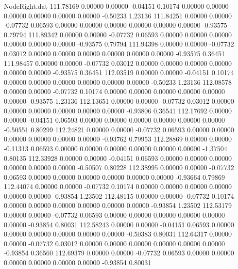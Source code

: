 \begin{filecontents}{NodeRight.dat}
 111.78169    0.00000    0.00000    -0.04151    0.10174    0.00000    0.00000    0.00000    0.00000    0.00000    0.00000   -0.50233    1.23136
 111.84251    0.00000    0.00000    -0.07732    0.06593    0.00000    0.00000    0.00000    0.00000    0.00000    0.00000   -0.93575    0.79794
 111.89342    0.00000    0.00000    -0.07732    0.06593    0.00000    0.00000    0.00000    0.00000    0.00000    0.00000   -0.93575    0.79794
 111.94398    0.00000    0.00000    -0.07732    0.03012    0.00000    0.00000    0.00000    0.00000    0.00000    0.00000   -0.93575    0.36451
 111.98457    0.00000    0.00000    -0.07732    0.03012    0.00000    0.00000    0.00000    0.00000    0.00000    0.00000   -0.93575    0.36451
 112.03519    0.00000    0.00000    -0.04151    0.10174    0.00000    0.00000    0.00000    0.00000    0.00000    0.00000   -0.50233    1.23136
 112.08578    0.00000    0.00000    -0.07732    0.10174    0.00000    0.00000    0.00000    0.00000    0.00000    0.00000   -0.93575    1.23136
 112.13651    0.00000    0.00000    -0.07732    0.03012    0.00000    0.00000    0.00000    0.00000    0.00000    0.00000   -0.93806    0.36541
 112.17692    0.00000    0.00000    -0.04151    0.06593    0.00000    0.00000    0.00000    0.00000    0.00000    0.00000   -0.50551    0.80299
 112.24821    0.00000    0.00000    -0.07732    0.06593    0.00000    0.00000    0.00000    0.00000    0.00000    0.00000   -0.93762    0.79953
 112.28869    0.00000    0.00000    -0.11313    0.06593    0.00000    0.00000    0.00000    0.00000    0.00000    0.00000   -1.37504    0.80135
 112.33928    0.00000    0.00000    -0.04151    0.06593    0.00000    0.00000    0.00000    0.00000    0.00000    0.00000   -0.50507    0.80228
 112.38995    0.00000    0.00000    -0.07732    0.06593    0.00000    0.00000    0.00000    0.00000    0.00000    0.00000   -0.93664    0.79869
 112.44074    0.00000    0.00000    -0.07732    0.10174    0.00000    0.00000    0.00000    0.00000    0.00000    0.00000   -0.93854    1.23502
 112.48115    0.00000    0.00000    -0.07732    0.10174    0.00000    0.00000    0.00000    0.00000    0.00000    0.00000   -0.93854    1.23502
 112.53179    0.00000    0.00000    -0.07732    0.06593    0.00000    0.00000    0.00000    0.00000    0.00000    0.00000   -0.93854    0.80031
 112.58243    0.00000    0.00000    -0.04151    0.06593    0.00000    0.00000    0.00000    0.00000    0.00000    0.00000   -0.50383    0.80031
 112.64317    0.00000    0.00000    -0.07732    0.03012    0.00000    0.00000    0.00000    0.00000    0.00000    0.00000   -0.93854    0.36560
 112.69379    0.00000    0.00000    -0.07732    0.06593    0.00000    0.00000    0.00000    0.00000    0.00000    0.00000   -0.93854    0.80031

\end{filecontents}
